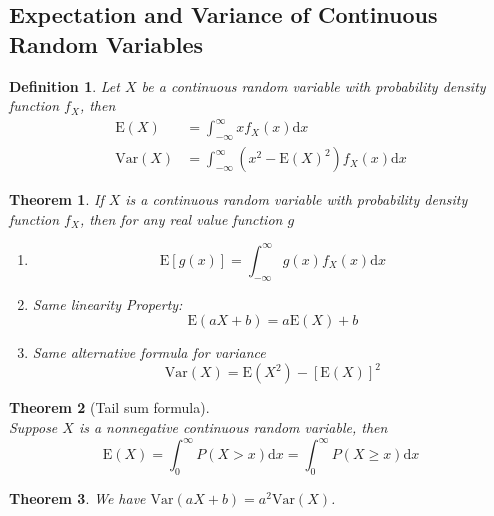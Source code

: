 \documentclass[12pt]{article}
\newcommand{\diff}{\mathrm{d}}
\newcommand{\var}{\mathrm{Var}}
\newcommand{\expec}{\mathrm{E}}
\newtheorem{definition}{Definition}[section]
\newtheorem{theorem}{Theorem}[section]
\theoremstyle{definition}
\begin{document}
\subsection{Expectation and Variance of Continuous Random Variables}
\begin{definition}\normalfont Let $X$ be a continuous random variable with probability density function $f_X$, then
\[
\begin{aligned}
\expec(X)&=\int_{-\infty}^\infty xf_X(x)\diff x\\
\var(X)&=\int_{-\infty}^\infty (x^2-\expec(X)^2)f_X(x)\diff x
\end{aligned}
\]
\end{definition}
\begin{theorem}\normalfont If $X$ is a continuous random variable with probability density function $f_X$, then for any real value function $g$
\begin{enumerate}
\item 
\[
\expec[g(x)]=\int_{-\infty}^\infty g(x)f_X(x)\diff x
\]
\item Same linearity Property:
\[
\expec(aX+b)=a\expec(X)+b
\]
\item Same alternative formula for variance
\[
\var(X)=\expec(X^2)-[\expec(X)]^2
\]
\end{enumerate}
\end{theorem}
\begin{theorem}[Tail sum formula]
\hfill\\\normalfont Suppose $X$ is a nonnegative continuous random variable, then
\[
\expec(X)=\int_0^\infty P(X>x)\diff x =\int_0^\infty P(X\geq x)\diff x
\]
\end{theorem}
\begin{theorem}\normalfont We have $\var(aX+b)=a^2\var(X)$.
\end{theorem}
\end{document}
